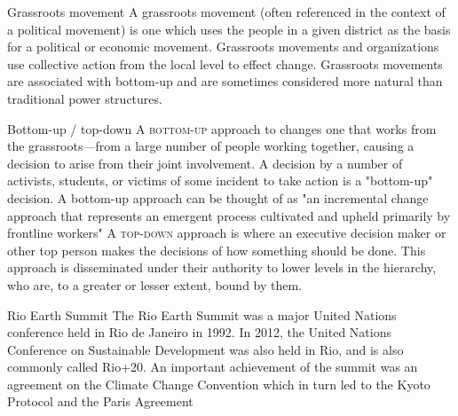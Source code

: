 \begin{sortEnvironment}{Grassroots movement}
A grassroots movement (often referenced in the context of a political movement) is one which uses the people in a given district as the basis for a political or economic movement. Grassroots movements and organizations use collective action from the local level to effect change. Grassroots movements are associated with bottom-up and are sometimes considered more natural than traditional power structures.
\end{sortEnvironment}

\begin{sortEnvironment}{Bottom-up / top-down}
\textsc{A bottom-up} approach to changes one that works from the grassroots—from a large number of people working together, causing a decision to arise from their joint involvement. A decision by a number of activists, students, or victims of some incident to take action is a "bottom-up" decision. A bottom-up approach can be thought of as "an incremental change approach that represents an emergent process cultivated and upheld primarily by frontline workers" 
\textsc{A top-down} approach is where an executive decision maker or other top person makes the decisions of how something should be done. This approach is disseminated under their authority to lower levels in the hierarchy, who are, to a greater or lesser extent, bound by them.
\end{sortEnvironment}

\begin{sortEnvironment}{Rio Earth Summit}
The Rio Earth Summit was a major United Nations conference held in Rio de Janeiro in 1992. In 2012, the United Nations Conference on Sustainable Development was also held in Rio, and is also commonly called Rio+20. An important achievement of the summit was an agreement on the Climate Change Convention which in turn led to the Kyoto Protocol and the Paris Agreement
\end{sortEnvironment}

